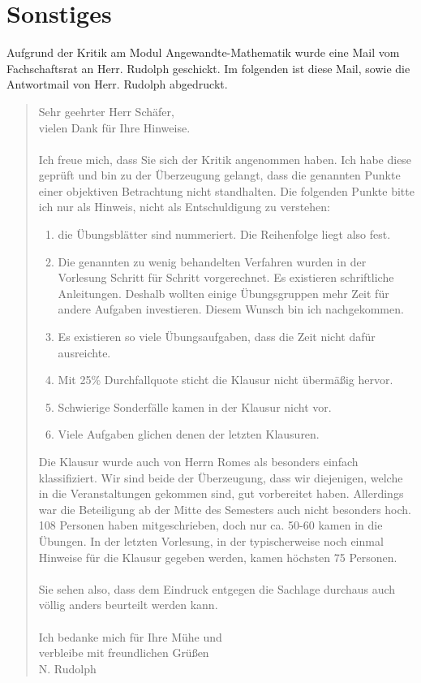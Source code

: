 \documentclass[a4paper, 11pt]{article} %
\begin{document}
\section{Sonstiges}
Aufgrund der Kritik am Modul Angewandte-Mathematik wurde eine Mail vom Fachschaftsrat an Herr. Rudolph geschickt. Im folgenden ist diese Mail, sowie die Antwortmail von Herr. Rudolph abgedruckt.
\pagebreak
\begin{quote}
Sehr geehrter Herr Schäfer, \\
vielen Dank für Ihre Hinweise. \\
\\
Ich freue mich, dass Sie sich der Kritik angenommen haben.  Ich habe diese geprüft und bin zu der Überzeugung gelangt, dass die genannten  Punkte einer objektiven Betrachtung nicht standhalten. Die folgenden Punkte bitte ich nur als Hinweis, nicht als Entschuldigung zu verstehen:
\begin{enumerate}
\item die Übungsblätter sind nummeriert. Die Reihenfolge liegt also fest.
\item Die genannten zu wenig behandelten Verfahren wurden in der Vorlesung Schritt für Schritt vorgerechnet. Es existieren schriftliche Anleitungen. Deshalb wollten einige Übungsgruppen mehr Zeit für andere Aufgaben investieren. Diesem Wunsch bin ich nachgekommen.
\item Es existieren so viele Übungsaufgaben, dass die Zeit nicht dafür ausreichte.
\item Mit 25\% Durchfallquote sticht die Klausur nicht übermäßig hervor.
\item Schwierige Sonderfälle kamen in der Klausur nicht vor. 
\item Viele Aufgaben glichen denen der letzten Klausuren.
\end{enumerate}
Die Klausur wurde auch von Herrn Romes als besonders einfach klassifiziert. Wir sind beide der Überzeugung, dass wir diejenigen, welche in die Veranstaltungen gekommen sind, gut vorbereitet haben. Allerdings war die Beteiligung ab der Mitte des Semesters auch nicht besonders hoch. 108 Personen haben mitgeschrieben, doch nur ca. 50-60 kamen in die Übungen. In der letzten Vorlesung, in der typischerweise noch einmal Hinweise für die Klausur gegeben werden, kamen höchsten 75 Personen. \\
\\
Sie sehen also, dass dem Eindruck entgegen die Sachlage durchaus auch  völlig anders beurteilt werden kann.\\
\\
Ich bedanke mich für Ihre Mühe und \\
verbleibe mit freundlichen Grüßen \\
N. Rudolph\\
\pagebreak


\end{quote}
\end{document}

